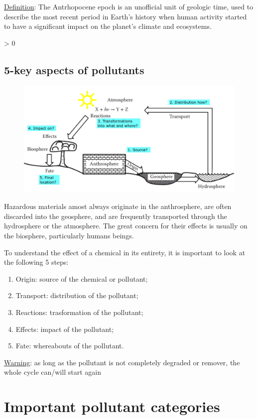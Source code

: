 \documentclass{article}
\makeatletter
\newcommand{\wrapfill}{
    \par
    \ifnum \value{WF@wrappedlines} > 0
        \addtocounter{WF@wrappedlines}{-1}%
        \null\vspace{
            \arabic{WF@wrappedlines}
            \baselineskip
        }
        \WFclear
    \fi
    \phantom{}
}
\newcommand{\cfig}[1]{%
  \begin{figure}[ht!]%
    \centering%
    #1%
  \end{figure}%
}
\newcommand{\defs}{\underline{Definition}: }
\newcommand{\wrn}{\underline{Warning}: }
\makeatother
\begin{document}
\defs{The Antrhopocene epoch is an unofficial unit of geologic time, used to describe the
    most recent period in Earth's history when human activity started to have a significant
    impact on the planet's climate and ecosystems.}
\wrapfill
\vspace*{-3cm}

\newpage
\subsection{5-key aspects of pollutants}
\cfig{\includegraphics*[width=\textwidth]{media/pollutant aspects.png}}

Hazardous materials amost always originate in the anthrosphere, are often discarded into
the geosphere, and are frequently transported through the hydrosphere or the atmosphere.
The great concern for their effects is usually on the biosphere, particularly humans beings.

To understand the effect of a chemical in its entirety, it is important to look at the following
5 steps:
\begin{enumerate}
    \item Origin: source of the chemical or pollutant;
    \item Transport: distribution of the pollutant;
    \item Reactions: trasformation of the pollutant;
    \item Effects: impact of the pollutant;
    \item Fate: whereabouts of the pollutant.
\end{enumerate}

\wrn{as long as the pollutant is not completely degraded or remover, the whole cycle
    can/will start again}

\section{Important pollutant categories}
\end{document}
